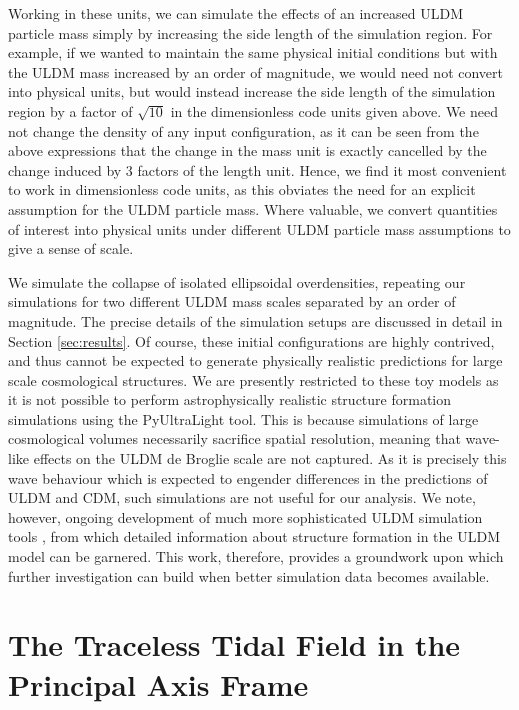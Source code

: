 \documentclass[a4paper,11pt]{article}
\begin{document}
Working in these units, we can simulate the effects of an increased ULDM particle mass simply by increasing the side length of the simulation region. For example, if we wanted to maintain the same physical initial conditions but with the ULDM mass increased by an order of magnitude, we would need not convert into physical units, but would instead increase the side length of the simulation region by a factor of $\sqrt{10}$ in the dimensionless code units given above. We need not change the density of any input configuration, as it can be seen from the above expressions that the change in the mass unit is exactly cancelled by the change induced by 3 factors of the length unit. Hence, we find it most convenient to work in dimensionless code units, as this obviates the need for an explicit assumption for the ULDM particle mass. Where valuable, we convert quantities of interest into physical units under different ULDM particle mass assumptions to give a sense of scale.

We simulate the collapse of isolated ellipsoidal overdensities, repeating our simulations for two different ULDM mass scales separated by an order of magnitude. The precise details of the simulation setups are discussed in detail in Section \ref{sec:results}. Of course, these initial configurations are highly contrived, and thus cannot be expected to generate physically realistic predictions for large scale cosmological structures. We are presently restricted to these toy models as it is not possible to perform astrophysically realistic structure formation simulations using the {\sc PyUltraLight} tool. This is because simulations of large cosmological volumes necessarily sacrifice spatial resolution, meaning that wave-like effects on the ULDM de Broglie scale are not captured. As it is precisely this wave behaviour which is expected to engender differences in the predictions of ULDM and CDM, such simulations are not useful for our analysis. We note, however, ongoing development of much more sophisticated ULDM simulation tools \cite{Mocz:2019emo, Niemeyer:2019aqm, Veltmaat:2019hou}, from which detailed information about structure formation in the ULDM model can be garnered. This work, therefore, provides a groundwork upon which further investigation can build when better simulation data becomes available.



\section{The Traceless Tidal Field in the Principal Axis Frame}\label{sec:TTT}
\end{document}
